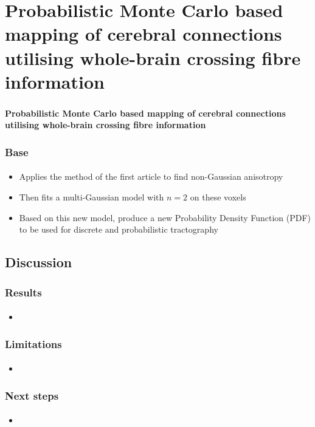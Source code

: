 \documentclass[10pt]{beamer}
\begin{document}
\section{Probabilistic Monte Carlo based mapping of cerebral connections utilising whole-brain crossing fibre information}
\begin{frame}
  \frametitle{}
  \framesubtitle{}

  \begin{Large}
  \begin{center}
  \textbf{Probabilistic Monte Carlo based mapping of cerebral connections utilising whole-brain crossing fibre information}
  \end{center}
  \end{Large}
\end{frame}

\begin{frame}
  \frametitle{Base}
  \framesubtitle{}

  \begin{itemize}
    \item Applies the method of the first article to find non-Gaussian anisotropy
    \item Then fits a multi-Gaussian model with $n=2$ on these voxels
    \item Based on this new model, produce a new Probability Density Function (PDF) to be used for discrete and probabilistic tractography
  \end{itemize}
\end{frame}

  \subsection{Discussion}
  \begin{frame}
    \frametitle{Results}
    \framesubtitle{}

    \begin{itemize}
      \item 
    \end{itemize}
  \end{frame}

  \begin{frame}
    \frametitle{Limitations}
    \framesubtitle{}

    \begin{itemize}
      \item 
    \end{itemize}
  \end{frame}

  \begin{frame}
    \frametitle{Next steps}
    \framesubtitle{}

    \begin{itemize}
      \item 
    \end{itemize}
  \end{frame}
\end{document}
